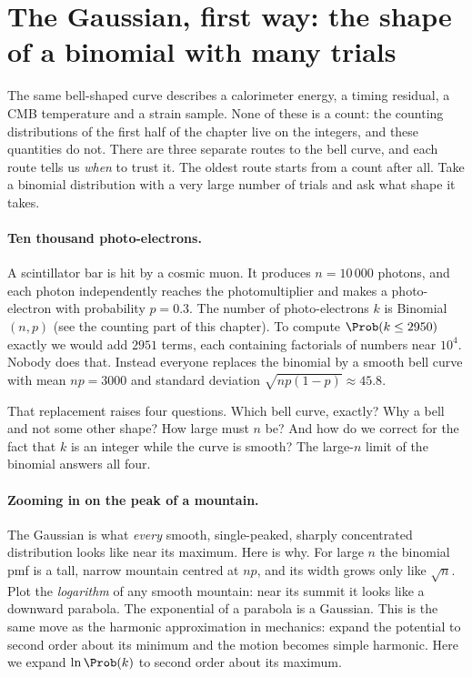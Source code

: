 \section{The Gaussian, first way: the shape of a binomial with many trials}
\label{2b:sec:gauss-binomial}

The same bell-shaped curve describes a calorimeter energy, a timing residual, a CMB temperature and a strain sample. None of these is a count: the counting distributions of the first half of the chapter live on the integers, and these quantities do not. There are three separate routes to the bell curve, and each route tells us \emph{when} to trust it. The oldest route starts from a count after all. Take a binomial distribution with a very large number of trials and ask what shape it takes.

\paragraph{Ten thousand photo-electrons.}
A scintillator bar is hit by a cosmic muon. It produces $n=10\,000$ photons, and each photon independently reaches the photomultiplier and makes a photo-electron with probability $p=0.3$. The number of photo-electrons $k$ is Binomial$(n,p)$ (see the counting part of this chapter). To compute $\Prob(k\le 2950)$ exactly we would add $2951$ terms, each containing factorials of numbers near $10^4$. Nobody does that. Instead everyone replaces the binomial by a smooth bell curve with mean $np=3000$ and standard deviation $\sqrt{np(1-p)}\approx 45.8$.

That replacement raises four questions. Which bell curve, exactly? Why a bell and not some other shape? How large must $n$ be? And how do we correct for the fact that $k$ is an integer while the curve is smooth? The large-$n$ limit of the binomial answers all four.

\paragraph{Zooming in on the peak of a mountain.}
The Gaussian is what \emph{every} smooth, single-peaked, sharply concentrated distribution looks like near its maximum. Here is why. For large $n$ the binomial pmf is a tall, narrow mountain centred at $np$, and its width grows only like $\sqrt n$. Plot the \emph{logarithm} of any smooth mountain: near its summit it looks like a downward parabola. The exponential of a parabola is a Gaussian. This is the same move as the harmonic approximation in mechanics: expand the potential to second order about its minimum and the motion becomes simple harmonic. Here we expand $\ln\Prob(k)$ to second order about its maximum.

